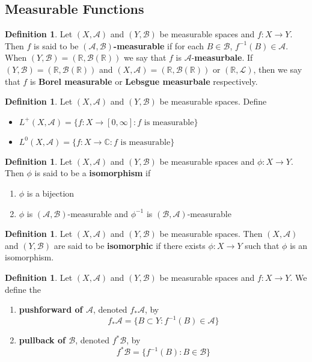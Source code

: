 \documentclass[12pt]{amsart}
\theoremstyle{definition}
\newtheorem{defn}[definition]{Definition}
\newcommand{\C}{\mathbb{C}}
\newcommand{\R}{\mathbb{R}}
\newcommand{\MA}{\mathcal{A}}
\newcommand{\MB}{\mathcal{B}}
\newcommand{\ML}{\mathcal{L}}
\newcommand{\RG}{[0,\infty]}
\newcommand{\ld}[1]{\label{defn:#1}}
\begin{document}
	\newpage
	\subsection{Measurable Functions}
	
	\begin{defn} \ld{00000} 
		Let $(X,\MA)$ and $(Y, \MB)$ be measurable spaces and $f:X \rightarrow Y$. Then $f$ is said to be \textbf{$(\MA,\MB)$-measurable} if for each $B \in \MB$, $f^{-1}(B) \in \MA$. When $(Y, \MB) = (\R, \MB(\R))$ we say that $f$ is $\MA$-\textbf{measurbale}. If $(Y,\MB) = (\R, \MB(\R))$ and $(X,\MA) = (\R, \MB(\R))$ or $(\R, \ML)$, then we say that $f$ is \textbf{Borel measurable} or \textbf{Lebsgue measurbale} respectively.
	\end{defn}
	
	\begin{defn} \ld{00000} 
		Let $(X, \MA)$ and $(Y, \MB)$ be measurable spaces. Define 
		\begin{itemize}
			\item $L^{+}(X, \MA) = \{f:X \rightarrow \RG : f \text{ is measurable}\}$
			\item $L^0(X, \MA) = \{f:X \rightarrow \C : f \text{ is measurable}\}$ 
		\end{itemize}
	\end{defn}
	
	\begin{defn}
		Let $(X, \MA)$ and $(Y, \MB)$ be measurable spaces and $\phi: X \rightarrow Y$. Then $\phi$ is said to be a \textbf{isomorphism} if 
		\begin{enumerate}
			\item $\phi$ is a bijection
			\item $\phi$ is $(\MA, \MB)$-measurable and $\phi^{-1}$ is $(\MB, \MA)$-measurable
		\end{enumerate}
	\end{defn}

	\begin{defn}
		Let $(X, \MA)$ and $(Y, \MB)$ be measurable spaces. Then $(X, \MA)$ and $(Y, \MB)$ are said to be \textbf{isomorphic} if there exists $\phi:X \rightarrow Y$ such that $\phi$ is an isomorphism.
	\end{defn}
	
	\begin{defn}
		Let $(X, \MA)$ and $(Y,\MB)$ be measurable spaces and $f: X \rightarrow Y$. We define the 
		\begin{enumerate}
			\item \textbf{pushforward of $\MA$}, denoted $f_*\MA$, by 
			$$f_*\MA = \{B \subset Y: f^{-1}(B) \in \MA\}$$ 
			\item  \textbf{pullback of $\MB$}, denoted $f^*\MB$, by  
			$$f^*\MB = \{f^{-1}(B):  B \in \MB \}$$
		\end{enumerate}
	\end{defn}
	
\end{document}
